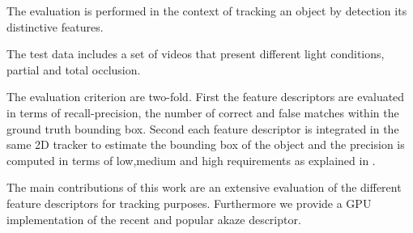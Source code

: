 \documentclass[letterpaper, 10pt, conference]{ieeeconf}
\begin{document}
The evaluation is performed in the context of tracking an object by detection its distinctive features. 

The test data includes a set of videos that present different light conditions, partial and total occlusion. 

The evaluation criterion are two-fold. First the feature descriptors are evaluated in terms of recall-precision, the number of correct and false matches within the ground truth bounding box. Second each feature descriptor is integrated in the same 2D tracker to estimate the bounding box of the object and the precision is computed in terms of low,medium and high requirements as explained in \cite{}.

The main contributions of this work are an extensive evaluation of the different feature descriptors for tracking purposes. Furthermore we provide a GPU implementation of the recent and popular akaze descriptor.



%

%







\end{document}
